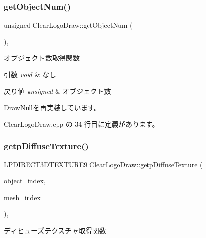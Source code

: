 \subsubsection{\texorpdfstring{get\+Object\+Num()}{getObjectNum()}}
{\footnotesize\ttfamily unsigned Clear\+Logo\+Draw\+::get\+Object\+Num (\begin{DoxyParamCaption}{ }\end{DoxyParamCaption})\hspace{0.3cm}{\ttfamily [override]}, {\ttfamily [virtual]}}



オブジェクト数取得関数 


\begin{DoxyParams}{引数}
{\em void} & なし \\
\hline
\end{DoxyParams}

\begin{DoxyRetVals}{戻り値}
{\em unsigned} & オブジェクト数 \\
\hline
\end{DoxyRetVals}


\mbox{\hyperlink{class_draw_null_a8bddfa6ee87e47b2ecbbe6803b088e37}{Draw\+Null}}を再実装しています。



 Clear\+Logo\+Draw.\+cpp の 34 行目に定義があります。

\mbox{\label{class_clear_logo_draw_adbf4078e91bef05bf5a366adcda744a3}} 
\subsubsection{\texorpdfstring{getp\+Diffuse\+Texture()}{getpDiffuseTexture()}}
{\footnotesize\ttfamily L\+P\+D\+I\+R\+E\+C\+T3\+D\+T\+E\+X\+T\+U\+R\+E9 Clear\+Logo\+Draw\+::getp\+Diffuse\+Texture (\begin{DoxyParamCaption}\item[{unsigned}]{object\+\_\+index,  }\item[{unsigned}]{mesh\+\_\+index }\end{DoxyParamCaption})\hspace{0.3cm}{\ttfamily [override]}, {\ttfamily [virtual]}}



ディヒューズテクスチャ取得関数 


